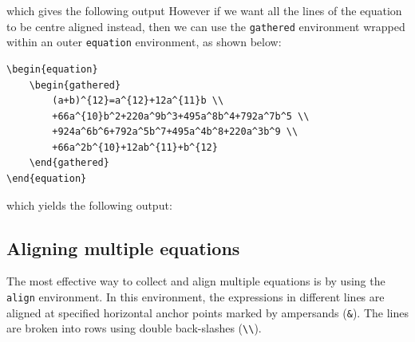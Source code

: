 		which gives the following output
		\setcounter{equation}{0}
		\newpage
		However if we want all the lines of the equation to be centre aligned instead, then we can use the \lstinline|gathered| environment wrapped within an outer \lstinline|equation| environment, as shown below:
\begin{lstlisting}
\begin{equation}
	\begin{gathered}
		(a+b)^{12}=a^{12}+12a^{11}b \\
		+66a^{10}b^2+220a^9b^3+495a^8b^4+792a^7b^5 \\
		+924a^6b^6+792a^5b^7+495a^4b^8+220a^3b^9 \\
		+66a^2b^{10}+12ab^{11}+b^{12}
	\end{gathered}
\end{equation}
\end{lstlisting}
		which yields the following output:		
		\setcounter{equation}{0}
		
	\subsection{Aligning multiple equations}
		The most effective way to collect and align multiple equations is by using the \lstinline|align| environment. In this environment, the expressions in different lines are aligned at specified horizontal anchor points marked by ampersands (\lstinline|&|). The lines are broken into rows using double back-slashes (\lstinline|\\|).
		
